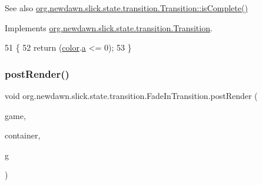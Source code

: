 \begin{DoxySeeAlso}{See also}
\mbox{\hyperlink{interfaceorg_1_1newdawn_1_1slick_1_1state_1_1transition_1_1_transition_af397d5185cf09c30c3f51d5021d63815}{org.\+newdawn.\+slick.\+state.\+transition.\+Transition\+::is\+Complete()}} 
\end{DoxySeeAlso}


Implements \mbox{\hyperlink{interfaceorg_1_1newdawn_1_1slick_1_1state_1_1transition_1_1_transition_af397d5185cf09c30c3f51d5021d63815}{org.\+newdawn.\+slick.\+state.\+transition.\+Transition}}.


\begin{DoxyCode}
51                                 \{
52         \textcolor{keywordflow}{return} (\mbox{\hyperlink{classorg_1_1newdawn_1_1slick_1_1state_1_1transition_1_1_fade_in_transition_afaaf133a75453117cbd4250e93f375fc}{color}}.\mbox{\hyperlink{classorg_1_1newdawn_1_1slick_1_1_color_ab9288c822ff7614a77c887eb8c2595a7}{a}} <= 0);
53     \}
\end{DoxyCode}
\mbox{\label{classorg_1_1newdawn_1_1slick_1_1state_1_1transition_1_1_fade_in_transition_ae1edbafe81aaa69c2d570d78f3e33c76}} 
\subsubsection{\texorpdfstring{post\+Render()}{postRender()}}
{\footnotesize\ttfamily void org.\+newdawn.\+slick.\+state.\+transition.\+Fade\+In\+Transition.\+post\+Render (\begin{DoxyParamCaption}\item[{\mbox{\hyperlink{classorg_1_1newdawn_1_1slick_1_1state_1_1_state_based_game}{State\+Based\+Game}}}]{game,  }\item[{\mbox{\hyperlink{classorg_1_1newdawn_1_1slick_1_1_game_container}{Game\+Container}}}]{container,  }\item[{\mbox{\hyperlink{classorg_1_1newdawn_1_1slick_1_1_graphics}{Graphics}}}]{g }\end{DoxyParamCaption})\hspace{0.3cm}{\ttfamily [inline]}}

